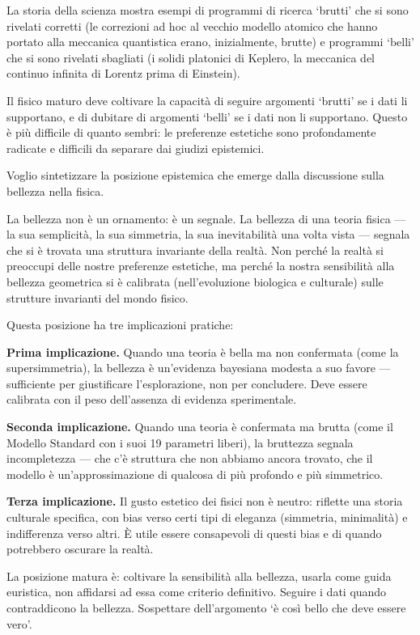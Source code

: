\documentclass[12pt,a4paper,openany]{book}
\newcommand{\sezione}[1]{\vspace{1.2em}{\large\bfseries #1}\vspace{0.5em}\par}
\begin{document}
La storia della scienza mostra esempi di programmi di ricerca `brutti' che si sono rivelati corretti (le correzioni ad hoc al vecchio modello atomico che hanno portato alla meccanica quantistica erano, inizialmente, brutte) e programmi `belli' che si sono rivelati sbagliati (i solidi platonici di Keplero, la meccanica del continuo infinita di Lorentz prima di Einstein).

Il fisico maturo deve coltivare la capacità di seguire argomenti `brutti' se i dati li supportano, e di dubitare di argomenti `belli' se i dati non li supportano. Questo è più difficile di quanto sembri: le preferenze estetiche sono profondamente radicate e difficili da separare dai giudizi epistemici.

\sezione{L'estetica come epistemologia: una sintesi}

Voglio sintetizzare la posizione epistemica che emerge dalla discussione sulla bellezza nella fisica.

La bellezza non è un ornamento: è un segnale. La bellezza di una teoria fisica --- la sua semplicità, la sua simmetria, la sua inevitabilità una volta vista --- segnala che si è trovata una struttura invariante della realtà. Non perché la realtà si preoccupi delle nostre preferenze estetiche, ma perché la nostra sensibilità alla bellezza geometrica si è calibrata (nell'evoluzione biologica e culturale) sulle strutture invarianti del mondo fisico.

Questa posizione ha tre implicazioni pratiche:

\textbf{Prima implicazione.} Quando una teoria è bella ma non confermata (come la supersimmetria), la bellezza è un'evidenza bayesiana modesta a suo favore --- sufficiente per giustificare l'esplorazione, non per concludere. Deve essere calibrata con il peso dell'assenza di evidenza sperimentale.

\textbf{Seconda implicazione.} Quando una teoria è confermata ma brutta (come il Modello Standard con i suoi 19 parametri liberi), la bruttezza segnala incompletezza --- che c'è struttura che non abbiamo ancora trovato, che il modello è un'approssimazione di qualcosa di più profondo e più simmetrico.

\textbf{Terza implicazione.} Il gusto estetico dei fisici non è neutro: riflette una storia culturale specifica, con bias verso certi tipi di eleganza (simmetria, minimalità) e indifferenza verso altri. È utile essere consapevoli di questi bias e di quando potrebbero oscurare la realtà.

La posizione matura è: coltivare la sensibilità alla bellezza, usarla come guida euristica, non affidarsi ad essa come criterio definitivo. Seguire i dati quando contraddicono la bellezza. Sospettare dell'argomento `è così bello che deve essere vero'.
\end{document}
